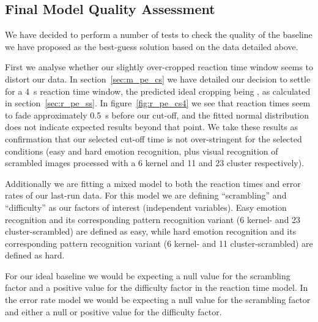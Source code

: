 	\subsection{Final Model Quality Assessment}
	    We have decided to perform a number of tests to check the quality of the baseline we have proposed as the best-guess solution based on the data detailed above.
	    
	    First we analyse whether our slightly over-cropped reaction time window seems to distort our data.
	    In section~\ref{sec:m_pe_cs} we have detailed our decision to settle for a \SI{4}{\second} reaction time window, the predicted ideal cropping being , as calculated in section~\ref{sec:r_pe_ss}.
	    In figure~\ref{fig:r_pe_cs4} we see that reaction times seem to fade approximately \SI{0.5}{\second} before our cut-off, and the fitted normal distribution does not indicate expected results beyond that point.
	    We take these results as confirmation that our selected cut-off time is not over-stringent for the selected conditions (easy and hard emotion recognition, plus visual recognition of scrambled images processed with a \SI{6}{\pixel} kernel and \SI{11}{\pixel} and \SI{23}{\pixel} cluster respectively).	    
	    
	    Additionally we are fitting a mixed model to both the reaction times and error rates of our last-run data.
	    For this model we are defining “scrambling” and “difficulty” as our factors of interest (independent variables).
	    Easy emotion recognition and its corresponding pattern recognition variant (\SI{6}{\pixel} kernel- and \SI{23}{\pixel} cluster-scrambled) are defined as easy,
	    while hard emotion recognition and its corresponding pattern recognition variant (\SI{6}{\pixel} kernel- and \SI{11}{\pixel} cluster-scrambled) are defined as hard.
	    
	    For our ideal baseline we would be expecting a null value for the scrambling factor and a positive value for the difficulty factor in the reaction time model.
	    In the error rate model we would be expecting a null value for the scrambling factor and either a null or positive value for the difficulty factor.

